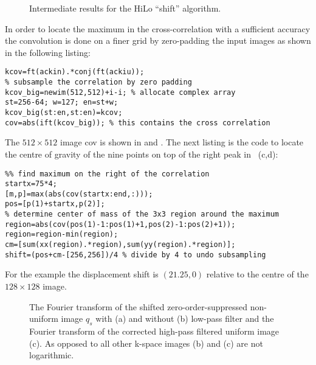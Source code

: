 \begin{figure}[htb]
  \centering {}
  \caption{Intermediate results for the HiLo ``shift'' algorithm.}
  \label{fig:hilo3}
\end{figure}
In order to locate the maximum in the cross-correlation with a
sufficient accuracy the convolution is done on a finer grid by
zero-padding the input images as shown in the following listing:
\begin{lstlisting}
kcov=ft(ackin).*conj(ft(ackiu));
% subsample the correlation by zero padding
kcov_big=newim(512,512)+i-i; % allocate complex array
st=256-64; w=127; en=st+w;
kcov_big(st:en,st:en)=kcov;
cov=abs(ift(kcov_big)); % this contains the cross correlation
\end{lstlisting}
The $512\times512$ image {\sf cov} is shown in  and
. The next listing is the code to locate the centre
of gravity of the nine points on top of the right peak in
~(c,d):
\begin{lstlisting}
%% find maximum on the right of the correlation
startx=75*4;
[m,p]=max(abs(cov(startx:end,:)));
pos=[p(1)+startx,p(2)];
% determine center of mass of the 3x3 region around the maximum
region=abs(cov(pos(1)-1:pos(1)+1,pos(2)-1:pos(2)+1));
region=region-min(region);
cm=[sum(xx(region).*region),sum(yy(region).*region)];
shift=(pos+cm-[256,256])/4 % divide by 4 to undo subsampling
\end{lstlisting}
For the example the displacement {\sf shift} is $(21.25,0)$ relative
to the centre of the $128\times128$ image.
\begin{figure}[htb]
  \centering {}
  \caption{The Fourier transform of the shifted zero-order-suppressed
    non-uniform image $q_s$ with (a) and without (b) low-pass filter
    and the Fourier transform of the corrected high-pass filtered
    uniform image (c). As opposed to all other k-space images (b) and
    (c) are not logarithmic.}
  \label{fig:hilo3_2}
\end{figure}
